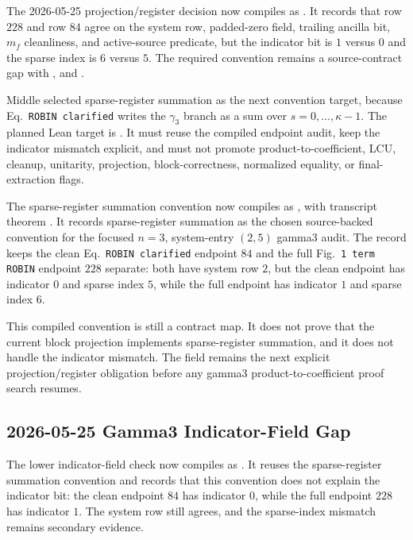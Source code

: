 The 2026-05-25 projection/register decision now compiles as
.  It records
that row \(228\) and row \(84\) agree on the system row, padded-zero field,
trailing ancilla bit, \(m_f\) cleanliness, and active-source predicate, but the
indicator bit is \(1\) versus \(0\) and the sparse index is \(6\) versus \(5\).
The required convention remains a source-contract gap with
, and .

Middle selected sparse-register summation as the next convention target,
because Eq.~\texttt{ROBIN clarified} writes the \(\gamma_3\) branch as a sum
over \(s=0,\dots,\kappa-1\).  The planned Lean target is
.  It must reuse
the compiled endpoint audit, keep the indicator mismatch explicit, and must not
promote product-to-coefficient, LCU, cleanup, unitarity, projection,
block-correctness, normalized equality, or final-extraction flags.

The sparse-register summation convention now compiles as
, with transcript
theorem
.
It records sparse-register summation as the chosen source-backed convention for
the focused \(n=3\), system-entry \((2,5)\) gamma3 audit.  The record keeps
the clean Eq.~\texttt{ROBIN clarified} endpoint \(84\) and the full
Fig.~\texttt{1 term ROBIN} endpoint \(228\) separate: both have system row
\(2\), but the clean endpoint has indicator \(0\) and sparse index \(5\),
while the full endpoint has indicator \(1\) and sparse index \(6\).

This compiled convention is still a contract map.  It does not prove that the
current block projection implements sparse-register summation, and it does not
handle the indicator mismatch.  The field
 remains the next explicit
projection/register obligation before any gamma3 product-to-coefficient proof
search resumes.

\subsection{2026-05-25 Gamma3 Indicator-Field Gap}

The lower indicator-field check now compiles as
.  It reuses
the sparse-register summation convention and records that this convention does
not explain the indicator bit: the clean endpoint \(84\) has indicator \(0\),
while the full endpoint \(228\) has indicator \(1\).  The system row still
agrees, and the sparse-index mismatch remains secondary evidence.

